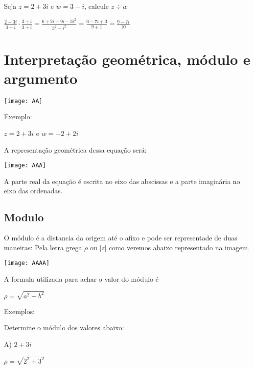 \documentclass[]{article}
\begin{document}
\begin{large}
\begin{flushleft}
Seja $z=2+3i$ e $w=3-i$, calcule $z \div w$ \vspace{.3cm}

\begin{center}
    $\frac{2-3i}{3-i} \cdot \frac{3+i}{3+i} = \frac{6+2i-9i-3i^2}{3^2-i^2} = \frac{6-7i+3}{9+1} = \frac{9-7i}{10}$ \vspace{.3cm}
\end{center}

\section{Interpretação geométrica, módulo e argumento}

\texttt{[image: AA]} \vspace{.3cm}

Exemplo: \vspace{.3cm}

\begin{center}
    $z=2+3i$ e $w=-2+2i$
\end{center}

A representação geométrica dessa equação será:

\texttt{[image: AAA]} \vspace{.3cm}

A parte real da equação é escrita no eixo das abscissas e a parte imaginária no eixo das ordenadas.

\subsection{Modulo}

O módulo é a distancia da origem até o afixo e pode ser representade de duas maneiras: Pela letra grega $\rho$ ou $|z|$ como veremos abaixo representado na imagem.

\texttt{[image: AAAA]} \vspace{.3cm}

A formula utilizada para achar o valor do módulo é \vspace{.3cm}
\begin{center}
    $\rho=\sqrt{a^2+b^2}$    
\end{center}


Exemplos: \vspace{.3cm}

Determine o módulo dos valores abaixo:

A) $2+3i$ \vspace{.2cm}
\begin{center}
$\rho=\sqrt{2^2+3^2}$


\end{center}
\end{flushleft}
\end{large}
\end{document}
